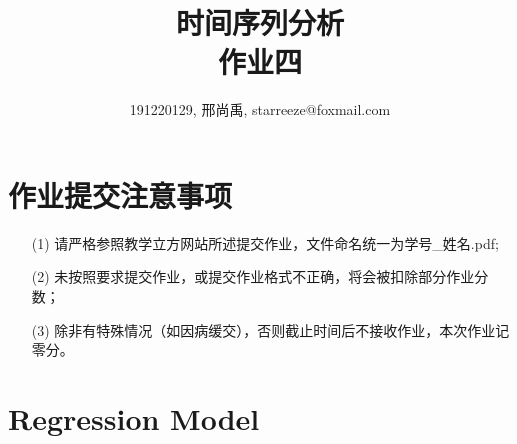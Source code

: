\documentclass[a4paper,UTF8]{article}
\numberwithin{equation}{section}
\begin{document}
\title{时间序列分析\\
作业四}
\author{191220129, 邢尚禹, starreeze@foxmail.com}
\maketitle

\section*{作业提交注意事项}
\begin{tcolorbox}
\begin{enumerate}
  \item[(1)] 请严格参照教学立方网站所述提交作业，文件命名统一为{\color{red}学号\_姓名.pdf};
  \item[(2)] 未按照要求提交作业，或提交作业格式不正确，将会被扣除部分作业分数；
  \item[(3)] 除非有特殊情况（如因病缓交），否则截止时间后不接收作业，本次作业记零分。
\end{enumerate}
\end{tcolorbox}
\section{Regression Model}
\end{document}
